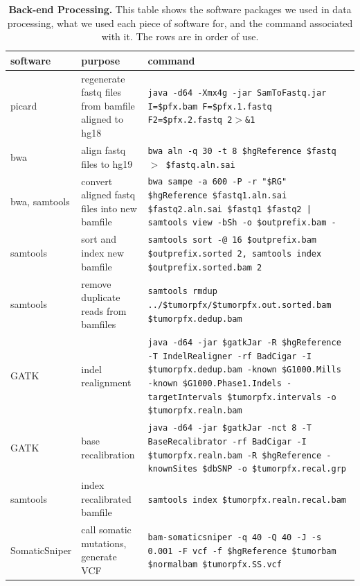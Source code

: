 \documentclass[11pt]{article} %
\begin{document}
\begin{landscape}
\begin{table}
\caption{\textbf{Back-end Processing.} This table shows the software packages we used in data processing, what we used each piece of software for, and the command associated with it. The rows are in order of use.}
\begin{tabular}{ p{2.5cm} p{6cm} p{12cm} }
	software & purpose & command\\
	\hline
	picard & regenerate fastq files from bamfile aligned to hg18 & \texttt{java -d64 -Xmx4g -jar SamToFastq.jar I=\$pfx.bam F=\$pfx.1.fastq F2=\$pfx.2.fastq 2$>$\&1} \\
	bwa & align fastq files to hg19 & \texttt{bwa aln -q 30 -t 8 \$hgReference \$fastq $>$ \$fastq.aln.sai} \\
	bwa, samtools & convert aligned fastq files into new bamfile & \texttt{bwa sampe -a 600 -P -r "\$RG" \$hgReference \$fastq1.aln.sai \$fastq2.aln.sai \$fastq1 \$fastq2 | samtools view -bSh -o \$outprefix.bam -} \\
	samtools & sort and index new bamfile & \texttt{samtools sort -@ 16 \$outprefix.bam \$outprefix.sorted 2, samtools index \$outprefix.sorted.bam 2} \\
	samtools & remove duplicate reads from bamfiles & \texttt{samtools rmdup ../\$tumorpfx/\$tumorpfx.out.sorted.bam \$tumorpfx.dedup.bam} \\
	GATK & indel realignment & \texttt{java -d64 -jar \$gatkJar -R \$hgReference -T IndelRealigner -rf BadCigar -I \$tumorpfx.dedup.bam -known \$G1000.Mills -known \$G1000.Phase1.Indels -targetIntervals \$tumorpfx.intervals -o \$tumorpfx.realn.bam} \\
	GATK & base recalibration & \texttt{java -d64 -jar \$gatkJar -nct 8 -T BaseRecalibrator -rf BadCigar -I \$tumorpfx.realn.bam -R \$hgReference -knownSites \$dbSNP -o \$tumorpfx.recal.grp} \\
	samtools & index recalibrated bamfile & \texttt{samtools index \$tumorpfx.realn.recal.bam} \\
	SomaticSniper & call somatic mutations, generate VCF & \texttt{bam-somaticsniper -q 40 -Q 40 -J -s 0.001 -F vcf -f \$hgReference \$tumorbam \$normalbam \$tumorpfx.SS.vcf} \\
\end{tabular}
\end{table}
\end{landscape}
\end{document}
